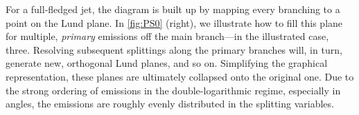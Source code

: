 
For a full-fledged jet, the diagram is built up by mapping every branching to a point on the Lund plane. In \autoref{fig:PS0} (right), we illustrate how to fill this plane for multiple, {\sl primary} emissions off the main branch---in the illustrated case, three. Resolving subsequent splittings along the primary branches will, in turn, generate new, orthogonal Lund planes, and so on. Simplifying the graphical representation, these planes are ultimately collapsed onto the original one. Due to the strong ordering of emissions in the double-logarithmic regime, especially in angles, the emissions are roughly evenly distributed in the splitting variables.


